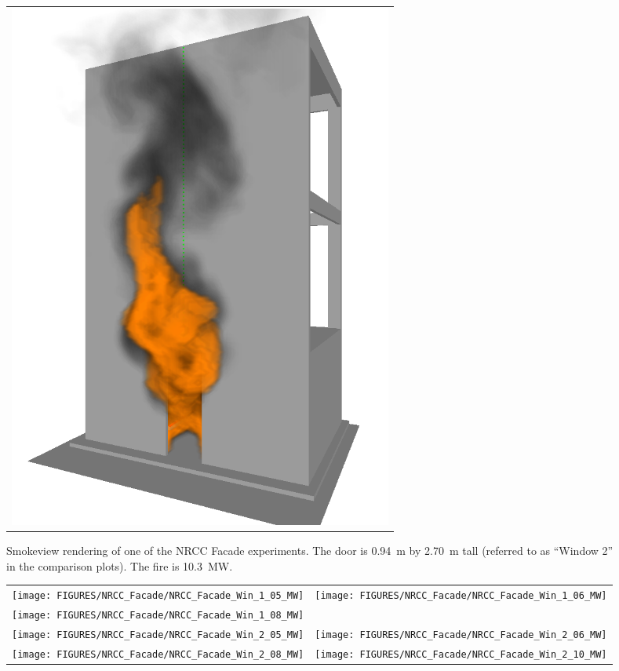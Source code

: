 \begin{figure}[h!]
\begin{center}
\begin{tabular}{c}
\includegraphics[width=5.0in]{FIGURES/NRCC_Facade/NRCC_Facade_Win_2_10_MW_0467}
\end{tabular}
\end{center}
\caption[Smokeview rendering of NRCC Facade experiment]
{Smokeview rendering of one of the NRCC Facade experiments. The door is
0.94~m by 2.70~m tall (referred to as ``Window 2'' in the comparison plots). The
fire is 10.3~MW.}
\label{NRCC_Facade_Image}
\end{figure}


\begin{figure}[p]
\begin{tabular*}{\textwidth}{l@{\extracolsep{\fill}}r}
\texttt{[image: FIGURES/NRCC\_Facade/NRCC\_Facade\_Win\_1\_05\_MW]} &
\texttt{[image: FIGURES/NRCC\_Facade/NRCC\_Facade\_Win\_1\_06\_MW]} \\
\texttt{[image: FIGURES/NRCC\_Facade/NRCC\_Facade\_Win\_1\_08\_MW]} &
  \\
\texttt{[image: FIGURES/NRCC\_Facade/NRCC\_Facade\_Win\_2\_05\_MW]} &
\texttt{[image: FIGURES/NRCC\_Facade/NRCC\_Facade\_Win\_2\_06\_MW]} \\
\texttt{[image: FIGURES/NRCC\_Facade/NRCC\_Facade\_Win\_2\_08\_MW]} &
\texttt{[image: FIGURES/NRCC\_Facade/NRCC\_Facade\_Win\_2\_10\_MW]}
\end{tabular*}
\label{NRCC_Facade_1}
\end{figure}

